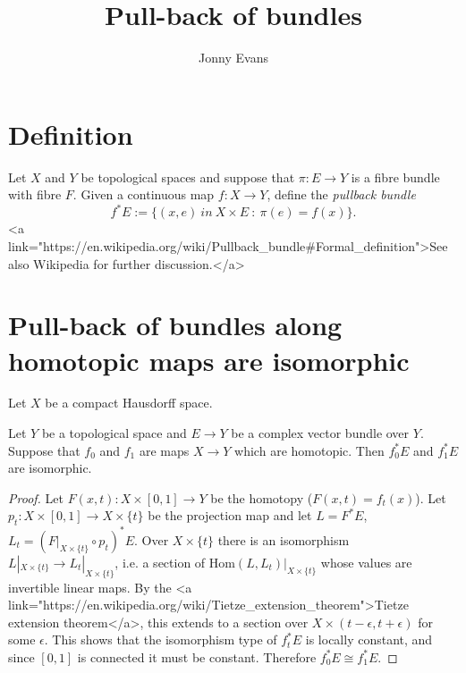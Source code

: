 \documentclass{amsart}
\title{Pull-back of bundles}
\author{Jonny Evans}
\begin{document}
\section{Definition}
\begin{Definition}
Let $X$ and $Y$ be topological spaces and suppose that $\pi\colon E\to Y$ is a fibre bundle with fibre $F$. Given a continuous map $f\colon X\to Y$, define the {\em pullback bundle}
\[f^*E:=\{(x,e)\ in\ X\times E\ :\ \pi(e)=f(x)\}.\]
<a link="https://en.wikipedia.org/wiki/Pullback_bundle#Formal_definition">See also Wikipedia for further discussion.</a>
\end{Definition}

\section{Pull-back of bundles along homotopic maps are isomorphic}

Let $X$ be a compact Hausdorff space.
\begin{Lemma}[lma1]
  Let $Y$ be a topological space and $E\to Y$ be a complex vector bundle over $Y$. Suppose that $f_0$ and $f_1$ are maps $X\to Y$ which are homotopic. Then $f_0^*E$ and $f_1^*E$ are isomorphic.
\end{Lemma}
\begin{proof}
  Let $F(x,t)\colon X\times [0,1]\to Y$ be the homotopy ($F(x,t)=f_t(x)$). Let $p_t\colon X\times [0,1]\to X\times\{t\}$ be the projection map and let $L=F^*E$, $L_t=(F|_{X\times\{t\}}\circ p_t)^*E$. Over $X\times\{t\}$ there is an isomorphism $L|_{X\times\{t\}}\to L_t|_{X\times\{t\}}$, i.e. a section of $\mathrm{Hom}(L,L_t)|_{X\times\{t\}}$ whose values are invertible linear maps. By the <a link="https://en.wikipedia.org/wiki/Tietze_extension_theorem">Tietze extension theorem</a>, this extends to a section over $X\times(t-\epsilon,t+\epsilon)$ for some $\epsilon$. This shows that the isomorphism type of $f_t^*E$ is locally constant, and since $[0,1]$ is connected it must be constant. Therefore $f_0^*E\cong f_1^*E$.
\end{proof}
\end{document}
